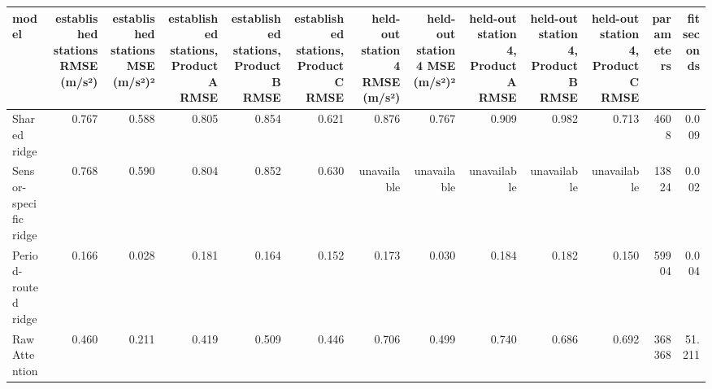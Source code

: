 \begin{tabular}{lrrrrrrrrrrrr}
\toprule
model & established stations RMSE (m/s²) & established stations MSE (m/s²)² & established stations, Product A RMSE & established stations, Product B RMSE & established stations, Product C RMSE & held-out station 4 RMSE (m/s²) & held-out station 4 MSE (m/s²)² & held-out station 4, Product A RMSE & held-out station 4, Product B RMSE & held-out station 4, Product C RMSE & parameters & fit seconds \\
\midrule
Shared ridge & 0.767 & 0.588 & 0.805 & 0.854 & 0.621 & 0.876 & 0.767 & 0.909 & 0.982 & 0.713 & 4608 & 0.009 \\
Sensor-specific ridge & 0.768 & 0.590 & 0.804 & 0.852 & 0.630 & unavailable & unavailable & unavailable & unavailable & unavailable & 13824 & 0.002 \\
Period-routed ridge & 0.166 & 0.028 & 0.181 & 0.164 & 0.152 & 0.173 & 0.030 & 0.184 & 0.182 & 0.150 & 59904 & 0.004 \\
Raw Attention & 0.460 & 0.211 & 0.419 & 0.509 & 0.446 & 0.706 & 0.499 & 0.740 & 0.686 & 0.692 & 368368 & 51.211 \\
\bottomrule
\end{tabular}
